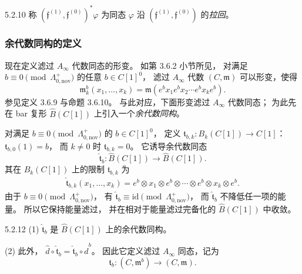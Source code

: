 \begin{definition}{5.2.10}\label{def:5-2-10}
称 $(\mathfrak f^{(1)},\mathfrak f^{(0)})^*\varphi$
为同态 $\varphi$ 沿
$(\mathfrak f^{(1)},\mathfrak f^{(0)})$
的\emph{拉回}。
\end{definition}
\subsubsection{余代数同构的定义}
\label{subsubsec:5-2-2-1}

现在定义滤过 $A_\infty$ 代数同态的形变。
如第 3.6.2 小节所见，
对满足 $b\equiv0\pmod{\Lambda_{0,\mathrm{nov}}^+}$
的任意 $b\in C[1]^0$，
滤过 $A_\infty$ 代数 $(C,\mathfrak m)$
可以形变，使得
\[
\mathfrak m_k^b(x_1,\ldots,x_k)
=\mathfrak m(e^b x_1e^b x_2\cdots e^b x_ke^b).
\]
参见定义 3.6.9 与命题 3.6.10。
与此对应，下面形变滤过 $A_\infty$ 代数同态；
为此先在 bar 复形 $\widehat B(C[1])$
上引入一个\emph{余代数同构}。

对满足 $b\equiv0\pmod{\Lambda_{0,\mathrm{nov}}^+}$
的 $b\in C[1]^0$，
定义 $\mathfrak t_{b,k}:B_k(C[1])\to C[1]$：
$\mathfrak t_{b,0}(1)=b$，
而 $k\ne0$ 时 $\mathfrak t_{b,k}=0$。
它诱导余代数同态
\[
\widehat{\mathfrak t}_b:
\widehat B(C[1])\longrightarrow\widehat B(C[1]).
\]
其在 $B_k(C[1])$ 上的限制
$\widehat{\mathfrak t}_{b,k}$ 为
\begin{equation}
\begin{aligned}
\widehat{\mathfrak t}_{b,k}(x_1,\ldots,x_k)
=e^b\otimes x_1\otimes e^b\otimes\cdots
\otimes e^b\otimes x_k\otimes e^b.
\end{aligned}
\tag{5.2.11}\label{eq:5-2-11}
\end{equation}
由于 $b\equiv0\pmod{\Lambda_{0,\mathrm{nov}}^+}$，
有 $\widehat{\mathfrak t}_b\equiv\mathrm{id}
\pmod{\Lambda_{0,\mathrm{nov}}^+}$，
而 $\widehat{\mathfrak t}_b$
不降低任一项的能量。
所以它保持能量滤过，
并在相对于能量滤过完备化的
$\widehat B(C[1])$ 中收敛。

\begin{lemma}{5.2.12}\label{lem:5-2-12}
\textup{(1)} $\widehat{\mathfrak t}_b$
是 $\widehat B(C[1])$ 上的余代数同构。

\textup{(2)} 此外，
$\widehat d\circ\widehat{\mathfrak t}_b
=\widehat{\mathfrak t}_b\circ\widehat d^b$。
因此它定义滤过 $A_\infty$ 同态，记为
\[
\mathfrak t_b:(C,\mathfrak m^b)
\longrightarrow(C,\mathfrak m).
\]
\end{lemma}

